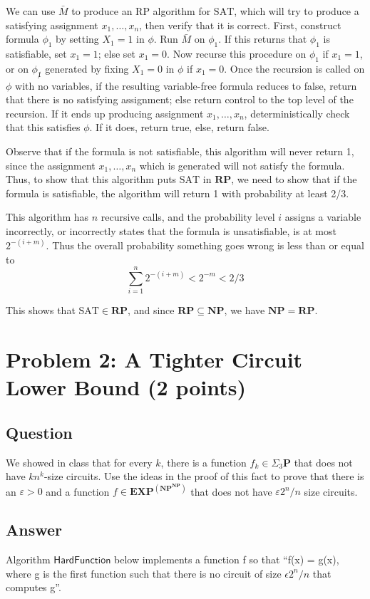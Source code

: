 \documentclass{article}
\renewcommand{\P}{\mathbf{P}}
\newcommand{\NP}{\mathbf{NP}}
\newcommand{\EXP}{\mathbf{EXP}}
\newcommand{\RP}{\mathbf{RP}}
\def \eps {{\varepsilon}}
\begin{document}
We can use $\bar{M}$ to produce an RP algorithm for $\text{SAT}$, which will try to produce a satisfying assignment $x_1, \dots, x_n$, then verify that it is correct.
First, construct formula $\phi_1$ by setting $X_1 = 1$ in $\phi$.  Run $\bar{M}$ on $\phi_1$.
If this returns that $\phi_1$ is satisfiable, set $x_1 = 1$; else set $x_1 = 0$.
Now recurse this procedure on $\phi_1$ if $x_1 = 1$, or on $\phi_{\not 1}$ generated by
fixing $X_1 = 0$ in $\phi$ if $x_1 = 0$.
Once the recursion is called on $\phi$ with no variables, if
the resulting variable-free formula reduces to false, return that there is no satisfying
assignment; else return control to the top level of the recursion.
If it ends up producing assignment $x_1, \dots, x_n$, deterministically check that this satisfies $\phi$.  If it does, return true, else, return false.

Observe that if the formula is not satisfiable, this algorithm will never return 1, since the assignment $x_1, \dots, x_n$ which is generated will not satisfy the formula.
Thus, to show that this algorithm puts $\text{SAT}$ in $\RP$, we need to show that if the formula is satisfiable, the algorithm will return 1 with probability at least 2/3.

This algorithm has $n$ recursive calls, and the probability level $i$ assigns a variable incorrectly, or incorrectly states that the formula is unsatisfiable, is at most $2^{-(i + m)}$.
Thus the overall probability something goes wrong is less than or equal to
$$
\sum_{i=1}^n{2^{-(i + m)}} < 2^{-m} < 2/3
$$

This shows that $\text{SAT} \in \RP$, and since $\RP \subseteq \NP$, we have $\NP = \RP$.


\newpage
\section*{Problem 2: A Tighter Circuit Lower Bound (2 points)}

\subsection*{Question}

We showed in class that for every $k$, there is a function $f_k \in \Sigma_3 \P$ that does not have $k n^k$-size circuits. Use the ideas in the proof of this fact to prove that there is an $\eps > 0$ and a function $f \in \EXP^{(\NP^{\NP})}$ that does not have $\eps 2^n/n$ size circuits.

\subsection*{Answer}
Algorithm $\mathsf{HardFunction}$ below implements a function f so that ``f(x) = g(x), where g is the first function such that there is no circuit of size $\epsilon 2^n/n$ that computes g''.
\end{document}
